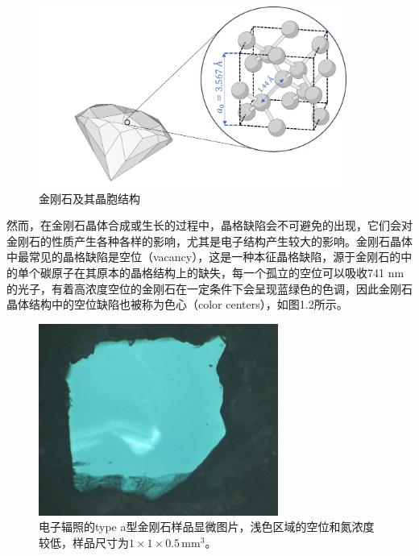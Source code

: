 \documentclass[type = bachelor]{whu-thesis}
\begin{document}
\begin{figure}[h]
  \centering
  \includegraphics[width=0.9\textwidth]{figures/Chapter 1/Diamond Lattice.png}
  \caption{金刚石及其晶胞结构}
  \label{fig:Diamond Lattice}
\end{figure}

然而，在金刚石晶体合成或生长的过程中，晶格缺陷会不可避免的出现，它们会对金刚石的性质产生各种各样的影响，尤其是电子结构产生较大的影响\cite{jelezko2006single, nebel2003electronic}。金刚石晶体中最常见的晶格缺陷是空位（vacancy），这是一种本征晶格缺陷，源于金刚石的中的单个碳原子在其原本的晶格结构上的缺失，每一个孤立的空位可以吸收741 nm的光子，有着高浓度空位的金刚石在一定条件下会呈现蓝绿色的色调，因此金刚石晶体结构中的空位缺陷也被称为色心（color centers），如图1.2所示\cite{waldermann2007creating, kiflawi2007electron}。

\begin{figure}
  \centering
  \includegraphics[width=0.7\textwidth]{figures/Chapter 1/Color Center.jpg}
  \caption{电子辐照的type \uppercase\expandafter{}a型金刚石样品显微图片，浅色区域的空位和氮浓度较低，样品尺寸为\(1\times1\times0.5 \, \mathrm{mm^3}\)。}
  \label{fig:Color Center}
\end{figure}
\end{document}
